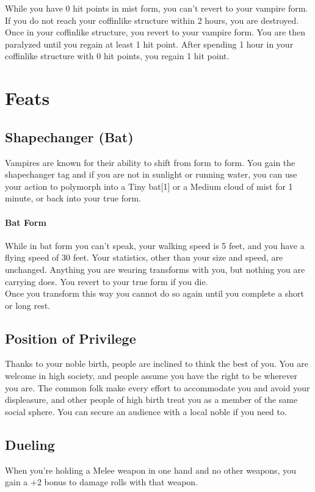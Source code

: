 \documentclass[letterpaper,openany,oneside,twocolumn]{book}
\begin{document}
While you have 0 hit points in mist form, you can't revert to your vampire form. If you do not reach your coffinlike structure within 2 hours, you are destroyed. Once in your coffinlike structure, you revert to your vampire form. You are then paralyzed until you regain at least 1 hit point. After spending 1 hour in your coffinlike structure with 0 hit points, you regain 1 hit point.

\section*{Feats}
\subsection*{Shapechanger (Bat)}
Vampires are known for their ability to shift from form to form. You gain the shapechanger tag and if you are not in sunlight or running water, you can use your action to polymorph into a Tiny bat[1] or a Medium cloud of mist for 1 minute, or back into your true form.
\paragraph*{Bat Form}
While in bat form you can't speak, your walking speed is 5 feet, and you have a flying speed of 30 feet. Your statistics, other than your size and speed, are unchanged. Anything you are wearing transforms with you, but nothing you are carrying does. You revert to your true form if you die.\\
Once you transform this way you cannot do so again until you complete a short or long rest.
\subsection*{Position of Privilege}
Thanks to your noble birth, people are inclined to think the best of you. You are welcome in high society, and people assume you have the right to be wherever you are. The common folk make every effort to accommodate you and avoid your displeasure, and other people of high birth treat you as a member of the same social sphere. You can secure an audience with a local noble if you need to.
\subsection*{Dueling}
When you're holding a Melee weapon in one hand and no other weapons, you gain a +2 bonus to damage rolls with that weapon.
\end{document}
